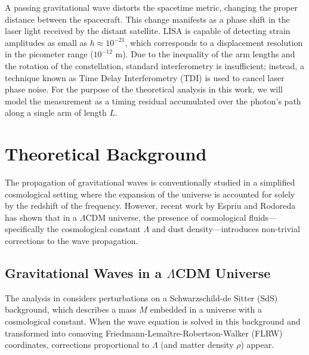 \documentclass[twocolumn]{revtex4-2}
\begin{document}
A passing gravitational wave distorts the spacetime metric, changing the proper distance between the spacecraft. This change manifests as a phase shift in the laser light received by the distant satellite. LISA is capable of detecting strain amplitudes as small as $h \approx 10^{-21}$, which corresponds to a displacement resolution in the picometer range ($10^{-12}$ m). Due to the inequality of the arm lengths and the rotation of the constellation, standard interferometry is insufficient; instead, a technique known as Time Delay Interferometry (TDI) \cite{Tinto2021} is used to cancel laser phase noise. For the purpose of the theoretical analysis in this work, we will model the measurement as a timing residual accumulated over the photon's path along a single arm of length $L$.


\section{Theoretical Background}

The propagation of gravitational waves is conventionally studied in a simplified cosmological setting \cite{CarrollSpacetime, MaggioreVol1} where the expansion of the universe is accounted for solely by the redshift of the frequency. However, recent work by Espriu and Rodoreda \cite{espriu2021} has shown that in a $\Lambda$CDM universe, the presence of cosmological fluids—specifically the cosmological constant $\Lambda$ and dust density—introduces non-trivial corrections to the wave propagation.

\subsection{Gravitational Waves in a $\Lambda$CDM Universe}
The analysis in \cite{espriu2021} considers perturbations on a Schwarzschild-de Sitter (SdS) background, which describes a mass $M$ embedded in a universe with a cosmological constant. When the wave equation is solved in this background and transformed into comoving Friedmann-Lemaître-Robertson-Walker (FLRW) coordinates, corrections proportional to $\Lambda$ (and matter density $\rho$) appear.
\end{document}
